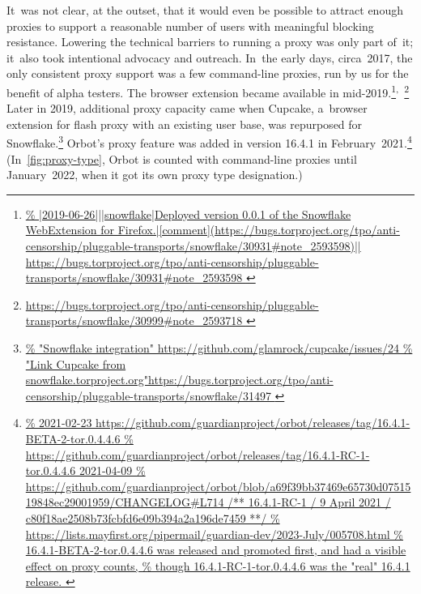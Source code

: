 \documentclass[letterpaper,twocolumn]{article}
\newlength{\urlfootnotesize}
\newcommand{\urlfootnote}[1]{\footnote{
\raggedright\hangindent\footnotemargin%
\fontsize{\urlfootnotesize}{\urlfootnotesize}\selectfont%
\url{#1}
}}
\begin{document}
It~was not clear, at the outset,
that it would even be possible to attract
enough proxies to support a reasonable number of users
with meaningful blocking resistance.
Lowering the technical barriers to running a proxy was only part of~it;
it~also took intentional advocacy and outreach.
In~the early days, circa~2017,
the only consistent proxy support was
a few command-line proxies,
run by us for the benefit of alpha testers.
The browser extension became available in mid-2019.\urlfootnote{
https://bugs.torproject.org/tpo/anti-censorship/pluggable-transports/snowflake/30931\#note_2593598
}\textsuperscript,\,%
\urlfootnote{
https://bugs.torproject.org/tpo/anti-censorship/pluggable-transports/snowflake/30999\#note_2593718
}
Later in 2019,
additional proxy capacity came when Cupcake,
a~browser extension for flash proxy with an existing user base,
was repurposed for Snowflake.\urlfootnote{
https://github.com/glamrock/cupcake/issues/24
}
Orbot's proxy feature was added in version 16.4.1 in February~2021.\urlfootnote{
https://github.com/guardianproject/orbot/releases/tag/16.4.1-BETA-2-tor.0.4.4.6
}
(In~\autoref{fig:proxy-type}, Orbot is counted with command-line proxies
until January~2022, when it got its own proxy type designation.)
\end{document}
